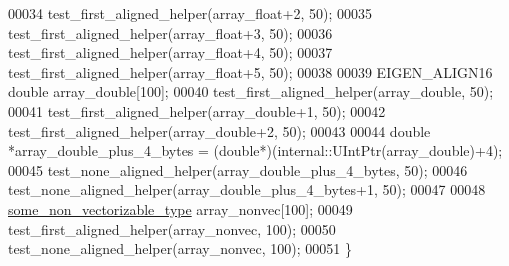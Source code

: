 \begin{DoxyCode}
00034   test\_first\_aligned\_helper(array\_float+2, 50);
00035   test\_first\_aligned\_helper(array\_float+3, 50);
00036   test\_first\_aligned\_helper(array\_float+4, 50);
00037   test\_first\_aligned\_helper(array\_float+5, 50);
00038   
00039   EIGEN\_ALIGN16 \textcolor{keywordtype}{double} array\_double[100];
00040   test\_first\_aligned\_helper(array\_double, 50);
00041   test\_first\_aligned\_helper(array\_double+1, 50);
00042   test\_first\_aligned\_helper(array\_double+2, 50);
00043   
00044   \textcolor{keywordtype}{double} *array\_double\_plus\_4\_bytes = (\textcolor{keywordtype}{double}*)(internal::UIntPtr(array\_double)+4);
00045   test\_none\_aligned\_helper(array\_double\_plus\_4\_bytes, 50);
00046   test\_none\_aligned\_helper(array\_double\_plus\_4\_bytes+1, 50);
00047   
00048   \hyperlink{structsome__non__vectorizable__type}{some\_non\_vectorizable\_type} array\_nonvec[100];
00049   test\_first\_aligned\_helper(array\_nonvec, 100);
00050   test\_none\_aligned\_helper(array\_nonvec, 100);
00051 \}
\end{DoxyCode}
